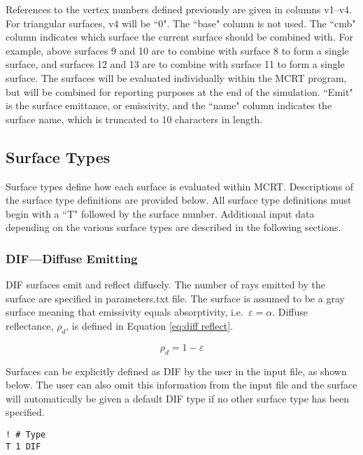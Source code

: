 \documentclass{article}
\begin{document}
References to the vertex numbers defined previously are given in columns v1--v4. For triangular surfaces, v4 will be ``0". The ``base" column is not used. The ``cmb" column indicates which surface the current surface should be combined with. For example, above surfaces 9 and 10 are to combine with surface 8 to form a single surface, and surfaces 12 and 13 are to combine with surface 11 to form a single surface. The surfaces will be evaluated individually within the MCRT program, but will be combined for reporting purposes at the end of the simulation. ``Emit" is the surface emittance, or emissivity, and the ``name" column indicates the surface name, which is truncated to 10 characters in length.

\subsection{Surface Types}
\label{subsec:surftypes}
Surface types define how each surface is evaluated within MCRT. Descriptions of the surface type definitions are provided below. All surface type definitions must begin with a ``T" followed by the surface number. Additional input data depending on the various surface types are described in the following sections.

\subsubsection{DIF---Diffuse Emitting}
\label{s-s-sec:dif}

DIF surfaces emit and reflect diffusely. The number of rays emitted by the surface are specified in parameters.txt file. The surface is assumed to be a gray surface meaning that emissivity equals absorptivity, i.e.~$\varepsilon = \alpha$. Diffuse reflectance, $\rho_{d}$, is defined in Equation \ref{eq:diff reflect}. 

\begin{equation}
   \label{eq:diff reflect}
   \rho_{d} = 1 - \varepsilon 
\end{equation}

Surfaces can be explicitly defined as DIF by the user in the input file, as shown below. The user can also omit this information from the input file and the surface will automatically be given a default DIF type if no other surface type has been specified.

\begin{lstlisting}
! # Type
T 1 DIF
\end{lstlisting}
\end{document}
